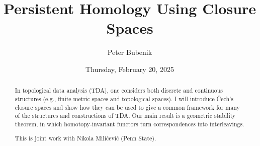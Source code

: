\documentclass{UAmathtalk}
\author{Peter Bubenik}
\title{Persistent Homology Using Closure Spaces}
\date{Thursday, February 20, 2025}
\begin{document}
\maketitle

\begin{abstract}
In topological data analysis (TDA), one considers both discrete and continuous structures (e.g., finite metric spaces and topological spaces). I will introduce Čech’s closure spaces and show how they can be used to give a common framework for many of the structures and constructions of TDA. Our main result is a geometric stability theorem, in which homotopy-invariant functors turn correspondences into interleavings.

This is joint work with Nikola Milićević (Penn State).
\end{abstract}
\end{document}
